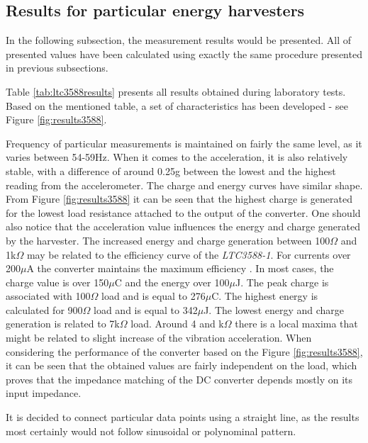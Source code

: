 \documentclass[12pt,a4paper]{article}
\begin{document}
\subsection{Results for particular energy harvesters}
In the following subsection, the measurement results would be presented. All of presented values have been calculated using exactly the same procedure presented in previous subsections.
\par
Table \ref{tab:ltc3588results} presents all results obtained during laboratory tests. Based on the mentioned table, a set of characteristics has been developed - see Figure \ref{fig:results3588}.
\par
Frequency of particular measurements is maintained on fairly the same level, as it varies between 54-59Hz. When it comes to the acceleration, it is also relatively stable, with a difference of around 0.25g between the lowest and the highest reading from the accelerometer. The charge and energy curves have similar shape. From Figure \ref{fig:results3588} it can be seen that the highest charge is generated for the lowest load resistance attached to the output of the converter. One should also notice that the acceleration value influences the energy and charge generated by the harvester. The increased energy and charge generation between 100$\Omega$ and 1k$\Omega$ may be related to the efficiency curve of the \textit{LTC3588-1}. For currents over 200$\mu$A the converter maintains the maximum efficiency \cite{ltc3588_params}. In most cases, the charge value is over 150$\mu$C and the energy over 100$\mu$J. The peak charge is associated with 100$\Omega$ load and is equal to 276$\mu$C. The highest energy is calculated for 900$\Omega$ load and is equal to 342$\mu$J. The lowest energy and charge generation is related to 7k$\Omega$ load. Around 4 and k$\Omega$ there is a local maxima that might be related to slight increase of the vibration acceleration. When considering the performance of the converter based on the Figure \ref{fig:results3588}, it can be seen that the obtained values are fairly independent on the load, which proves that the impedance matching of the DC converter depends mostly on its input impedance.
\par
It is decided to connect particular data points using a straight line, as the results most certainly would not follow sinusoidal or polynominal pattern.
\clearpage
\end{document}
